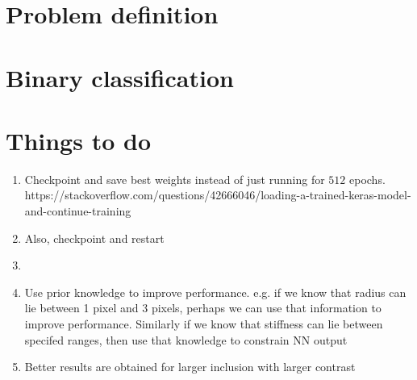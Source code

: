 \documentclass[12pt]{article}
\begin{document}
\section{Problem definition}
\section{Binary classification}





\section{Things to do}
\begin{enumerate}
\item{Checkpoint and save best weights instead of just running for $512$ epochs. https://stackoverflow.com/questions/42666046/loading-a-trained-keras-model-and-continue-training}
\item{Also, checkpoint and restart}
\item{}
\item{Use prior knowledge to improve performance. e.g. if we know that radius can lie between 1 pixel and 3 pixels, perhaps we can use that information to improve performance. Similarly if we know that stiffness can lie between specifed ranges, then use that knowledge to constrain NN output}
\item{Better results are obtained for larger inclusion with larger contrast}
\end{enumerate}

{}

\end{document}
